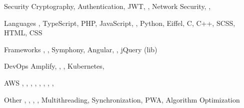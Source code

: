 

\begin{cvskills}

\cvskill
  {Security} %
  {Cryptography, Authentication, JWT, , Network Security, , } %

\cvskill
  {Languages} %
  {, TypeScript, PHP, JavaScript, , Python, Eiffel, C, C++, SCSS, HTML, CSS} %

\cvskill
  {Frameworks} %
  {, , Symphony, Angular, , jQuery (lib)} %


\cvskill
  {DevOps} %
  {Amplify, , , Kubernetes, } %

\cvskill
  {AWS} %
  {, , , , , , , , } %


\cvskill
  {Other} %
  {, , , , Multithreading, Synchronization, PWA, Algorithm Optimization} %

\end{cvskills}
